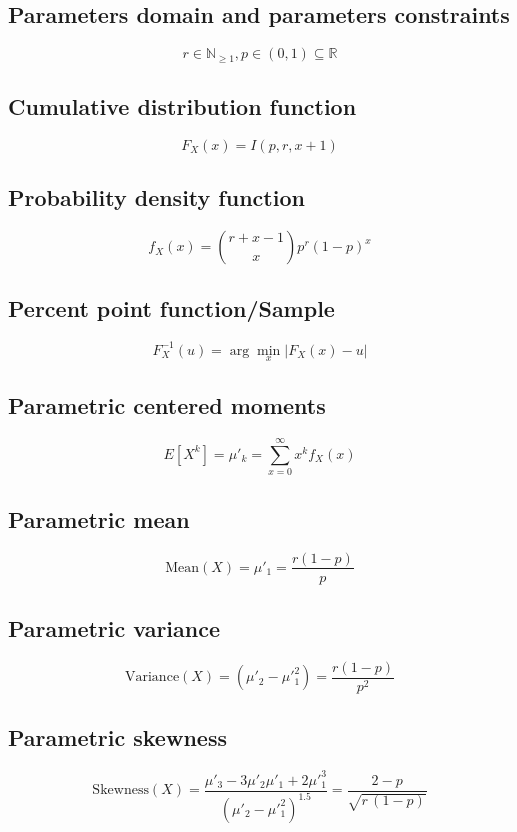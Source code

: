 \documentclass{article}
\begin{document}
\subsection{Parameters domain and parameters constraints}
\begin{equation*} r\in\mathbb{N}_{\geqslant 1}, p\in\left(0,1\right)\subseteq\mathbb{R} \end{equation*}
\subsection{Cumulative distribution function}
\begin{equation*} F_{X}\left(x\right)=I(p,r,x+1) \end{equation*}
\subsection{Probability density function}
\begin{equation*} f_{X}\left(x\right)=\binom{r+x-1}{x}p^r(1-p)^x \end{equation*}
\subsection{Percent point function/Sample}
\begin{equation*} F^{-1}_{X}\left(u\right)=\arg\min_{x}\left| F_{X}\left(x\right)-u \right| \end{equation*}
\subsection{Parametric centered moments}
\begin{equation*} E[X^k]=\mu'_{k}=\sum_{x=0}^{\infty}x^{k}f_{X}\left(x\right) \end{equation*}
\subsection{Parametric mean}
\begin{equation*} \mathrm{Mean}(X)=\mu'_{1}=\frac{r(1-p)}{p} \end{equation*}
\subsection{Parametric variance}
\begin{equation*} \mathrm{Variance}(X)=(\mu'_{2}-\mu'^{2}_{1})=\frac{r(1-p)}{p^2} \end{equation*}
\subsection{Parametric skewness}
\begin{equation*} \mathrm{Skewness}(X)=\frac{\mu'_{3}-3\mu'_{2}\mu'_{1}+2\mu'^{3}_{1}}{(\mu'_{2}-\mu'^{2}_{1})^{1.5}}=\frac{2-p}{\sqrt{r\,(1-p)}} \end{equation*}
\end{document}
